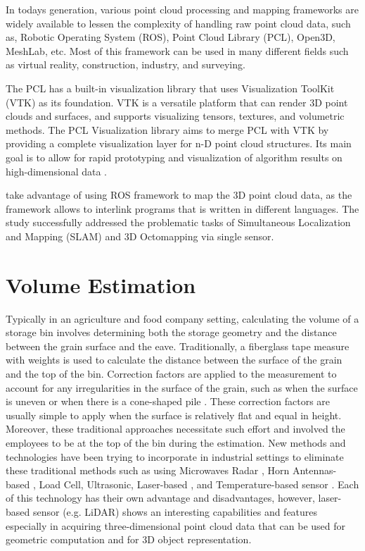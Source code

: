 In todays generation, various point cloud processing and mapping frameworks are widely available to lessen the complexity of handling raw point cloud data, such as, Robotic Operating System (ROS), Point Cloud Library (PCL), Open3D, MeshLab, etc. Most of this framework can be used in many different fields such as virtual reality, construction, industry, and surveying.

The PCL has a built-in visualization library that uses Visualization ToolKit (VTK) as its foundation. VTK is a versatile platform that can render 3D point clouds and surfaces, and supports visualizing tensors, textures, and volumetric methods. The PCL Visualization library aims to merge PCL with VTK by providing a complete visualization layer for n-D point cloud structures. Its main goal is to allow for rapid prototyping and visualization of algorithm results on high-dimensional data \citep{rusu2011}.

\citet{ocando2017} take advantage of using ROS framework to map the 3D point cloud data, as the framework allows to interlink programs that is written in different languages. The study successfully addressed the problematic tasks of Simultaneous Localization and Mapping (SLAM) and 3D Octomapping via single sensor.

\section{Volume Estimation}
\label{rrl:sec:Industrial Volume Measurement}
Typically in an agriculture and food company setting, calculating the volume of a storage bin involves determining both the storage geometry and the distance between the grain surface and the eave. Traditionally, a fiberglass tape measure with weights is used to calculate the distance between the surface of the grain and the top of the bin. Correction factors are applied to the measurement to account for any irregularities in the surface of the grain, such as when the surface is uneven or when there is a cone-shaped pile \citep{turner2016}. These correction factors are usually simple to apply when the surface is relatively flat and equal in height. Moreover, these traditional approaches necessitate such effort and involved the employees to be at the top of the bin during the estimation. New methods and technologies have been trying to incorporate in industrial settings to eliminate these traditional methods such as using Microwaves Radar \citep{vogt2017}, Horn Antennas-based \citep{duysak2020, yigit2015}, Load Cell, Ultrasonic, Laser-based \citep{geuvara2020}, and Temperature-based sensor \citep{rhee2021}. Each of this technology has their own advantage and disadvantages, however, laser-based sensor (e.g. LiDAR) shows an interesting capabilities and features especially in acquiring three-dimensional point cloud data that can be used for geometric computation and for 3D object representation.

